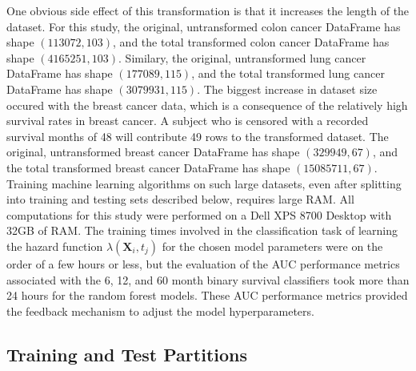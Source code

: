 \documentclass[10pt,letterpaper]{article}
\begin{document}
One obvious side effect of this transformation is that it increases the length of the dataset.
For this study, the original, untransformed colon cancer DataFrame has shape $(113072, 103)$, and the total transformed colon cancer DataFrame has shape $(4165251, 103)$.
Similary, the original, untransformed lung cancer DataFrame has shape $(177089, 115)$, and the total transformed lung cancer DataFrame has shape $(3079931, 115)$.
The biggest increase in dataset size occured with the breast cancer data, which is a consequence of the relatively high survival rates in breast cancer. A subject who is censored with a recorded survival months of 48 will contribute 49 rows to the transformed dataset.  
The original, untransformed breast cancer DataFrame has shape $(329949, 67)$, and the total transformed breast cancer DataFrame has shape $(15085711, 67)$.
Training machine learning algorithms on such large datasets, even after splitting into training and testing sets described below, requires large RAM. All computations for this study were performed on a Dell XPS 8700 Desktop with 32GB of RAM. The training times involved in the classification task of learning the hazard function $\lambda(\mathbf{X}_{i}, t_{j})$ for the chosen model parameters were on the order of a few hours or less, but the evaluation of the AUC performance metrics associated with the 6, 12, and 60 month binary survival classifiers
 took more than 24 hours for the random forest models. These AUC performance metrics provided the feedback mechanism to adjust the model hyperparameters.
\subsection*{Training and Test Partitions}
\label{subsec:traintest}
\end{document}
